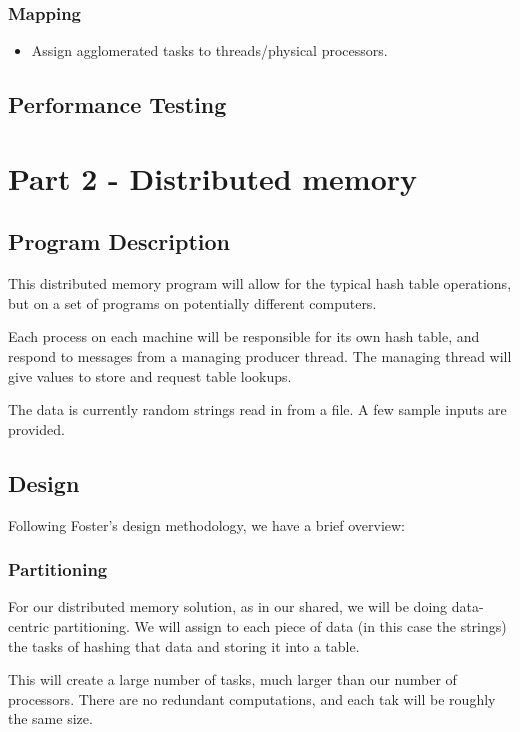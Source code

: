 \documentclass{article}
\begin{document}
\subsubsection{Mapping}
        \begin{itemize}
            \item Assign agglomerated tasks to threads/physical processors.
        \end{itemize}


\subsection{Performance Testing}


\section{Part 2 - Distributed memory}
\subsection{Program Description}
This distributed memory program will allow for the typical hash table operations, but on a set of programs on potentially different computers.

Each process on each machine will be responsible for its own hash table, and respond to messages from a managing producer thread. The managing thread will give values to store and request table lookups.

The data is currently random strings read in from a file. A few sample inputs are provided.

\subsection{Design}
Following Foster's design methodology, we have a brief overview:

\subsubsection{Partitioning}
For our distributed memory solution, as in our shared, we will be doing data-centric partitioning. We will assign to each piece of data (in this case the strings) the tasks of hashing that data and storing it into a table. 

This will create a large number of tasks, much larger than our number of processors. There are no redundant computations, and each tak will be roughly the same size.
\end{document}
